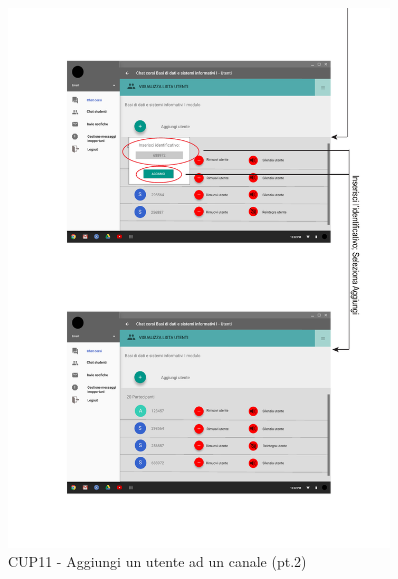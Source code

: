 \begin{figure}
	\centering
	\includegraphics[width=0.9\textwidth]{imgs/gruppo6/activities/act_cup11_aggiungi_utente_canale2.pdf}
	\caption{CUP11 - Aggiungi un utente ad un canale (pt.2)}
	\label{fig:act-cup11-2}
\end{figure}

